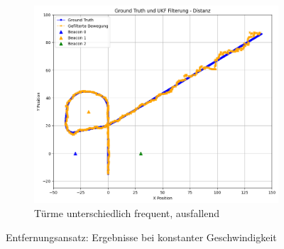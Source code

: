 \begin{figure}
\begin{subfigure}{.333\textwidth}
        \includegraphics[width=.9\linewidth]{Ergebnisse/plots_fahrten/distanz/distanz_const_vel_flag_freq.png}
        \caption{Türme unterschiedlich frequent, ausfallend}
    \end{subfigure}
    \caption{Entfernungsansatz: Ergebnisse bei konstanter Geschwindigkeit}
\end{figure}